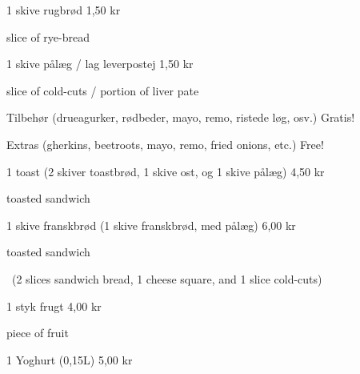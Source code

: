 \documentclass{article}
\begin{document}

\maketitle

\null
\vspace{-0.8cm}


\vspace{0.5cm}

1 skive rugbrød \hfill 1,50 kr

{ slice of rye-bread}

\vspace{0.3cm}

1 skive pålæg / lag leverpostej \hfill 1,50 kr

{ slice of cold-cuts / portion of liver pate}

\vspace{0.3cm}

Tilbehør {\large (drueagurker, rødbeder, mayo, remo, ristede løg, osv.)}
\hfill Gratis!

{\english Extras \large (gherkins, beetroots, mayo, remo, fried onions, etc.)}
\hfill  {\english Free!}

\vspace{0.3cm}

1 toast {\large (2 skiver toastbrød, 1 skive ost, og 1 skive pålæg)}
\hfill 4,50 kr

{ toasted sandwich}

\vspace{0.3cm}

1 skive franskbrød {\large (1 skive franskbrød, med pålæg)}
\hfill 6,00 kr

{ toasted sandwich}

\vspace{-0.1cm}

{\english\large\quad\ (2 slices sandwich bread, 1 cheese square, and 1 slice
cold-cuts)}

\vspace{0.3cm}

1 styk frugt
\hfill 4,00 kr

{ piece of fruit}

\vspace{0.3cm}

1 Yoghurt (0,15L)
\hfill 5,00 kr

\vspace{0.3cm}
\end{document}
